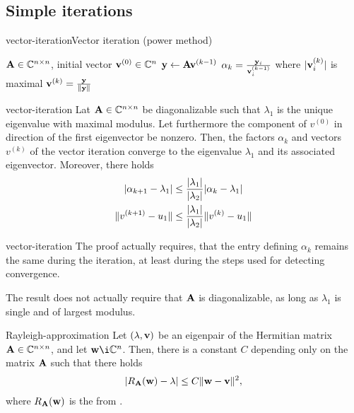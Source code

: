 
\subsection{Simple iterations}

\begin{Algorithm*}{vector-iteration}{Vector iteration (power method)}
  \begin{algorithmic}[1]
    \Require $\mathbf A\in\mathbb C^{n\times n}$, initial vector $\mathbf v^{(0)}\in\mathbb C^n$
    \State $\mathbf y \gets \mathbf A \mathbf v^{(k-1)}$
    \State $\alpha_k = \frac{\mathbf y_i}{\mathbf v^{(k-1)}_i}$
    where $\lvert\mathbf v^{(k)}_i\rvert$ is maximal
    \State $\mathbf v^{(k)} = \frac{\mathbf y}{\lVert\mathbf y\rVert}$
    \EndFor
  \end{algorithmic}
\end{Algorithm*}

\begin{Theorem}{vector-iteration}
  Lat $\mathbf A\in\mathbb C^{n\times n}$ be diagonalizable such that $\lambda_1$ is the
  unique eigenvalue with maximal modulus. Let furthermore the
  component of $v^{(0)}$ in direction of the first eigenvector be
  nonzero. Then, the factors $\alpha_k$ and vectors $v^{(k)}$ of the
  vector iteration converge to the eigenvalue $\lambda_1$ and its
  associated eigenvector. Moreover, there holds
  \begin{align}
    \lvert\alpha_{k+1}-\lambda_1\rvert
    &\le \frac{\lvert\lambda_1\rvert}{\lvert\lambda_2\rvert} \lvert\alpha_{k}-\lambda_1\rvert\\
    \lVert v^{(k+1)}-u_1\rVert
    &\le \frac{\lvert\lambda_1\rvert}{\lvert\lambda_2\rvert} \lVert v^{(k)}-u_1\rVert
  \end{align}
\end{Theorem}

\begin{Remark}{vector-iteration}
  The proof actually requires, that the entry defining $\alpha_k$
  remains the same during the iteration, at least during the steps
  used for detecting convergence.

  The result does not actually require that $\mathbf A$ is diagonalizable,
  as long as $\lambda_1$ is single and of largest modulus.
\end{Remark}

\begin{Lemma}{Rayleigh-approximation}
  Let $(\lambda,\mathbf v)$ be an eigenpair of the Hermitian matrix
  $\mathbf A\in\mathbb C^{n\times n}$, and let $\vw\i\C^n$. Then, there is a constant $C$ depending only on the matrix $\mathbf A$ such that there holds
  \begin{gather}
    \lvert R_\mathbf A(\mathbf w)-\lambda\rvert \le C \lVert\mathbf w-\mathbf v\rVert^2,
  \end{gather}
  where $R_\mathbf A(\mathbf w)$ is the  from
  .
\end{Lemma}

